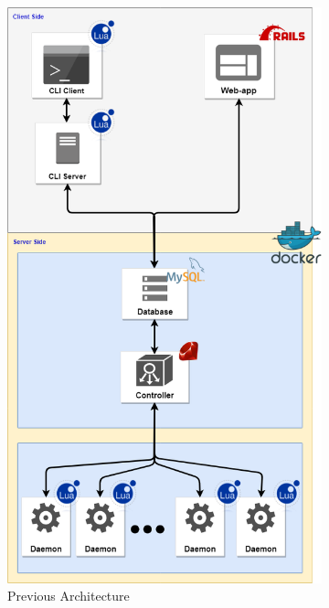 \documentclass{eplmastersthesis}
\begin{document}
      \begin{figure}[!tbp]
        \centering
        \begin{subfigure}{0.45\textwidth}
          \includegraphics[width=\textwidth]{figures/prev_arch.png}
          \caption{Previous Architecture}
        \end{subfigure}
        \hfill
        \begin{subfigure}{0.45\textwidth}

\end{subfigure}
\end{figure}
\end{document}
